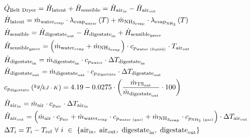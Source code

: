 \begin{refsection}[referencesApD]
\begin{align}
& \dot{Q}_{\text{Belt Dryer}} = \dot{H}_{\text{latent}} + \dot{H}_{\text{sensible}} = \dot{H}_{\text{air}_{\text{in}}} - \dot{H}_{\text{air}_{\text{out}}} \label{eq:BD1} 
\\
& \dot{H}_{\text{latent}} = \dot{m}_{\text{water}_\text{evap}} \cdot \lambda_{\text{evap}_{\text{water}}}\left(T\right) + \dot{m}_{\text{NH}_{3_\text{evap}}} \cdot \lambda_{\text{evap}_{\text{NH}_3}}\left(T\right) \label{eq:BD2} 
\\
& \dot{H}_{\text{sensible}} = \dot{H}_{\text{digestate}_\text{out}} - \dot{H}_{\text{digestate}_\text{in}} + \dot{H}_{\text{sensible}_{\text{gases}}} \label{eq:BD3} \\
& \dot{H}_{\text{sensible}_{\text{gases}}} = \left( \dot{m}_{\text{water}_\text{evap}} + \dot{m}_{\text{NH}_{3_\text{evap}}} \right) \cdot c_{p_{\text{water (liquid)}}} \cdot T_{\text{air}_\text{out}} \label{eq:BD4} 
\\
& \dot{H}_{\text{digestate}_{\text{in}}} = \dot{m}_{\text{digestate}_{\text{in}}} \cdot c_{p_{\text{water}}} \cdot \Delta T_{\text{digestate}_\text{in}} \label{eq:BD5} 
\\
& \dot{H}_{\text{digestate}_{\text{out}}} = \dot{m}_{\text{digestate}_{\text{out}}} \cdot c_{p_{\text{digestate}}} \cdot \Delta T_{\text{digestate}_\text{out}} \label{eq:BD6} 
\\
& c_{p_{\text{digestate}}} \left(\sfrac{kg}{kJ \cdot K}\right)= 4.19-0.0275 \cdot \left(\frac{\dot{m}_{\text{TS}_{\text{out}}}}{\dot{m}_{\text{digestate}_{\text{out}}}} \cdot 100 \right) \label{eq:BD7} 
\\	
& \dot{H}_{\text{air}_{\text{in}}} = \dot{m}_{\text{air}} \cdot c_{p_{\text{air}}} \cdot \Delta T_{\text{air}_\text{in}} \label{eq:BD8} 
\\	
& \dot{H}_{\text{air}_{\text{out}}} = \left(\dot{m}_{\text{air}} \cdot c_{p_{\text{air}}} + \dot{m}_{\text{water}_\text{evap}} \cdot c_{p_{\text{water (gas)}}} + \dot{m}_{\text{NH}_{3_\text{evap}}} \cdot c_{p_{\text{NH\textsubscript{3} (gas)}}} \right) \cdot \Delta T_{\text{air}_\text{out}} \label{eq:BD9} 
\\	
& \Delta T_i = T_i - T_\text{ref} \ \forall \ i \ \in \ \{\text{air}_\text{in}, \ \text{air}_\text{out},  \ \text{digestate}_\text{in}, \ \text{digestate}_\text{out} \} \label{eq:BD10}
\end{align}


\end{refsection}
